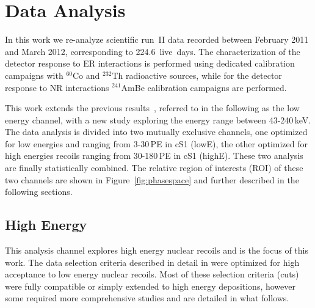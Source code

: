 \section{Data Analysis}
\label{sec:Analysis}
In this work we re-analyze  scientific run~II data recorded between February 2011 and March 2012, 
corresponding to 224.6~live~days. The characterization of the detector response to ER interactions is performed using dedicated calibration campaigns with $^{60}$Co and $^{232}$Th radioactive sources, while for the detector response to NR interactions $^{241}$AmBe calibration campaigns are performed.

 
This work extends the previous results~\cite{xe100_run10_si,xe100_run_combination}, referred to in the following as the low energy channel, with a new study exploring the energy range between 43-240\,keV. 
The data analysis is divided into two mutually exclusive channels, one optimized for low energies and ranging from 3-30\,PE in cS1 (lowE), 
the other optimized for high energies recoils ranging from 30-180\,PE in cS1 (highE).  These two analysis are finally statistically combined. 
The relative region of interests (ROI) of these two channels are shown in Figure~\ref{fig:phasespace} and further described in the following sections. 



\subsection{High Energy}
\label{subsubsec:HighE}
This analysis channel explores high energy nuclear recoils and is the focus of this work. The data selection criteria described in detail in \cite{Aprile:2012vw} were optimized for high 
acceptance to low energy nuclear recoils.
Most of these selection criteria (cuts) were fully compatible or simply extended to high energy depositions, however some required
more comprehensive studies and are detailed in what follows. 

